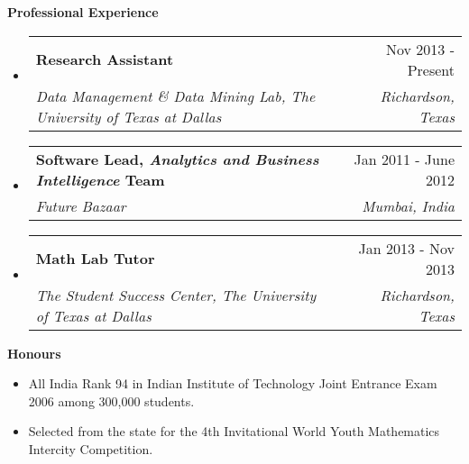 \documentclass[letterpaper,11pt]{article}
\makeatletter
\newcommand{\resitem}[1]{\item[\ding{226}] #1 \vspace{-2pt}}
\newcommand{\resheading}[1]{{\large \colorbox{mygrey}{\begin{minipage}{\textwidth}{\textbf{#1 \vphantom{p\^{E}}}}\end{minipage}}}}
\newcommand{\ressubheading}[4]{
\begin{tabular*}{7.0in}{l@{\extracolsep{\fill}}r}
		\textbf{#1} & #2 \\
		\textit{#3} & \textit{#4} \\
\end{tabular*}\vspace{-6pt}}
\makeatother
\begin{document}
\resheading{Professional Experience}
\begin{itemize}
\item
	\ressubheading{Research Assistant}{Nov 2013 - Present}{Data Management \& Data Mining Lab, The University of Texas at Dallas}{Richardson, Texas}

\item
	\ressubheading{Software Lead, \textit{Analytics and Business Intelligence} Team}{Jan 2011 - June 2012}{Future Bazaar}{Mumbai, India}

\item
	\ressubheading{Math Lab Tutor}{Jan 2013 - Nov 2013}{The Student Success Center, The University of Texas at Dallas}{Richardson, Texas} 

\end{itemize}

\resheading{Honours}
\begin{itemize}

\item{All India Rank 94 in Indian Institute of Technology Joint Entrance Exam 2006 among 300,000 students.}
\item{Selected from the state for the 4th Invitational World Youth Mathematics Intercity Competition.}

\end{itemize}

%
%
\end{document}
